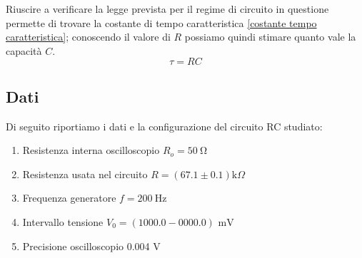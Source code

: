 \documentclass[letterpaper,12pt]{article}
\begin{document}
Riuscire a verificare la legge prevista per il regime di circuito in questione permette di trovare la costante di tempo caratteristica \ref{costante tempo caratteristica}; conoscendo il valore di $R$ possiamo quindi stimare quanto vale la capacità $C$.
\begin{equation}
    \tau = RC
    \label{costante tempo caratteristica}
\end{equation}
\newpage



\subsection{Dati}
Di seguito riportiamo i dati e la configurazione del circuito RC studiato:
\begin{enumerate}[itemsep=1pt]
    \item Resistenza interna oscilloscopio $R_o = \SI{50}{\ohm}$
    \item Resistenza usata nel circuito $R = (67.1\pm0.1) \text{k}\Omega$
    \item Frequenza generatore $f = \SI{200}{\hertz}$
    \item Intervallo tensione $V_0= (1000.0 - 0000.0) \text{ mV}$
    \item Precisione oscilloscopio 0.004 V
\end{enumerate}


\end{document}
